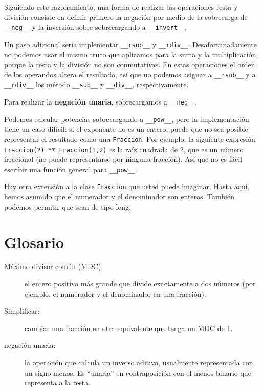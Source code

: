 Siguiendo este razonamiento, una forma de realizar las operaciones
resta y división consiste en definir primero la negación por medio
de la sobrecarga de \texttt{\_\_neg\_\_} y la inversión sobre sobrecargando
a \texttt{\_\_invert\_\_}.

Un paso adicional sería implementar \texttt{\_\_rsub\_\_} y \texttt{\_\_rdiv\_\_}.
Desafortunadamente no podemos usar el mismo truco que aplicamos para
la suma y la multiplicación, porque la resta y la división no son
conmutativas. En estas operaciones el orden de los operandos altera
el resultado, así que no podemos asignar a \texttt{\_\_rsub\_\_} y
a \texttt{\_\_rdiv\_\_} los método \texttt{\_\_sub\_\_} y \texttt{\_\_div\_\_},
respectivamente.

Para realizar la \textbf{negación unaria}, sobrecargamos a \texttt{\_\_neg\_\_}.

 

Podemos calcular potencias sobrecargando a \texttt{\_\_pow\_\_}, pero
la implementación tiene un caso difícil: si el exponente no es un
entero, puede que no sea posible representar el resultado como una
\texttt{Fraccion}. Por ejemplo, la siguiente expresión \texttt{Fraccion(2)
{*}{*} Fraccion(1,2)} es la raíz cuadrada de 2, que es un número irracional
(no puede representarse por ninguna fracción). Así que no es fácil
escribir una función general para \texttt{\_\_pow\_\_}.


Hay otra extensión a la clase \texttt{Fraccion} que usted puede imaginar.
Hasta aquí, hemos asumido que el numerador y el denominador son enteros.
También podemos permitir que sean de tipo long.

\section{Glosario}
\begin{description}
\item [{Máximo divisor común (MDC):}] el entero positivo más grande
que divide exactamente a dos números (por ejemplo, el numerador y
el denominador en una fracción).
\item [{Simplificar:}] cambiar una fracción en otra equivalente que tenga
un MDC de 1.
\item [{negación unaria:}] la operación que calcula un inverso aditivo,
usualmente representada con un signo menos. Es ``unaria'' en contraposición
con el menos binario que representa a la resta.

  
\end{description}

